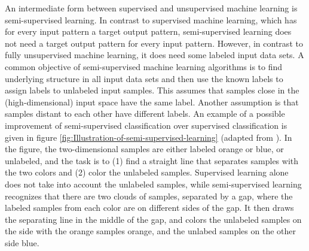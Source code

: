An intermediate form between supervised and unsupervised machine learning
is semi-supervised learning. In contrast
to supervised machine learning, which has for every input pattern
a target output pattern, semi-supervised learning does not need a
target output pattern for every input pattern. However, in contrast
to fully unsupervised machine learning, it does need some labeled
input data sets. A common objective of semi-supervised machine learning
algorithms is to find underlying structure in all input data sets
and then use the known labels to assign labels to unlabeled input
samples. This assumes that samples close in the (high-dimensional)
input space have the same label. Another assumption is that samples
distant to each other have different labels. An example of a possible
improvement of semi-supervised classification over supervised classification
is given in figure \ref{fig:Illustration-of-semi-supervised-learning}
(adapted from \cite{Joachims1999a}). In the figure, the two-dimensional
samples are either labeled orange or blue, or unlabeled, and the task
is to (1) find a straight line that separates samples with the two
colors and (2) color the unlabeled samples. Supervised learning alone
does not take into account the unlabeled samples, while semi-supervised
learning recognizes that there are two clouds of samples, separated
by a gap, where the labeled samples from each color are on different
sides of the gap. It then draws the separating line in the middle
of the gap, and colors the unlabeled samples on the side with the
orange samples orange, and the unlabed samples on the other side blue.

